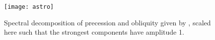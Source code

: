\begin{figure}
\texttt{[image: astro]}
\caption
{
 Spectral decomposition of precession and obliquity given by \cite{berger78}, scaled here such that the strongest components have amplitude 1. }
\label{fig:astro}
\end{figure}
